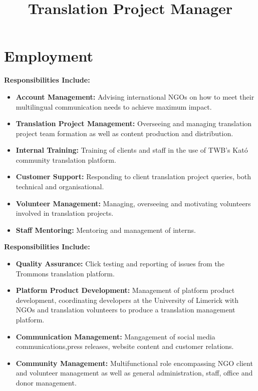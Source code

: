 \documentclass[a4paper,11pt]{moderncv}
\title{Translation Project Manager}
\begin{document}
\maketitle

\section{Employment}

{
  \textbf{Responsibilities Include:}
  \begin{itemize}
  \item \textbf{Account Management:} Advising international NGOs on how to meet their multilingual communication needs to achieve maximum impact.
  \item \textbf{Translation Project Management:} Overseeing and managing translation project team formation as well as content production and distribution.
  \item \textbf{Internal Training:} Training of clients and staff in the use of TWB's Kató community translation platform.
  \item \textbf{Customer Support:} Responding to client translation project queries, both technical and organisational.
  \item \textbf{Volunteer Management:} Managing, overseeing and motivating volunteers involved in translation projects.
  \item \textbf{Staff Mentoring:} Mentoring and management of interns.
  \end{itemize}
}

{
  \textbf{Responsibilities Include:}
  \begin{itemize}
  \item \textbf{Quality Assurance:} Click testing and reporting of issues from the Trommons translation platform.
  \item \textbf{Platform Product Development:} Management of platform product development, coordinating developers at the University of Limerick with NGOs and translation volunteers to produce a translation management platform.
  \item \textbf{Communication Management:} Mangagement of social media communications,press releases, website content and customer relations.
  \item \textbf{Community Management:} Multifunctional role encompassing NGO client and volunteer management as well as  general administration, staff, office and donor management.
  \end{itemize}
}
\end{document}
